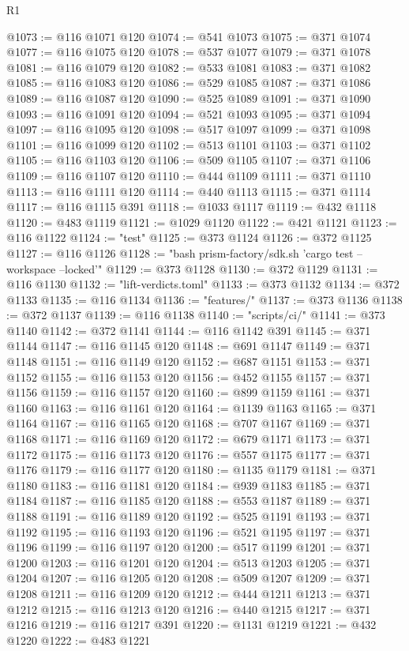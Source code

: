 \begin{lexlean}{R1}
\begin{coremodule}
@1073 := @116 @1071 @120
@1074 := @541 @1073
@1075 := @371 @1074
@1077 := @116 @1075 @120
@1078 := @537 @1077
@1079 := @371 @1078
@1081 := @116 @1079 @120
@1082 := @533 @1081
@1083 := @371 @1082
@1085 := @116 @1083 @120
@1086 := @529 @1085
@1087 := @371 @1086
@1089 := @116 @1087 @120
@1090 := @525 @1089
@1091 := @371 @1090
@1093 := @116 @1091 @120
@1094 := @521 @1093
@1095 := @371 @1094
@1097 := @116 @1095 @120
@1098 := @517 @1097
@1099 := @371 @1098
@1101 := @116 @1099 @120
@1102 := @513 @1101
@1103 := @371 @1102
@1105 := @116 @1103 @120
@1106 := @509 @1105
@1107 := @371 @1106
@1109 := @116 @1107 @120
@1110 := @444 @1109
@1111 := @371 @1110
@1113 := @116 @1111 @120
@1114 := @440 @1113
@1115 := @371 @1114
@1117 := @116 @1115 @391
@1118 := @1033 @1117
@1119 := @432 @1118
@1120 := @483 @1119
@1121 := @1029 @1120
@1122 := @421 @1121
@1123 := @116 @1122
@1124 := "test"
@1125 := @373 @1124
@1126 := @372 @1125
@1127 := @116 @1126
@1128 := "bash prism-factory/sdk.sh 'cargo test --workspace --locked'"
@1129 := @373 @1128
@1130 := @372 @1129
@1131 := @116 @1130
@1132 := "lift-verdicts.toml"
@1133 := @373 @1132
@1134 := @372 @1133
@1135 := @116 @1134
@1136 := "features/"
@1137 := @373 @1136
@1138 := @372 @1137
@1139 := @116 @1138
@1140 := "scripts/ci/"
@1141 := @373 @1140
@1142 := @372 @1141
@1144 := @116 @1142 @391
@1145 := @371 @1144
@1147 := @116 @1145 @120
@1148 := @691 @1147
@1149 := @371 @1148
@1151 := @116 @1149 @120
@1152 := @687 @1151
@1153 := @371 @1152
@1155 := @116 @1153 @120
@1156 := @452 @1155
@1157 := @371 @1156
@1159 := @116 @1157 @120
@1160 := @899 @1159
@1161 := @371 @1160
@1163 := @116 @1161 @120
@1164 := @1139 @1163
@1165 := @371 @1164
@1167 := @116 @1165 @120
@1168 := @707 @1167
@1169 := @371 @1168
@1171 := @116 @1169 @120
@1172 := @679 @1171
@1173 := @371 @1172
@1175 := @116 @1173 @120
@1176 := @557 @1175
@1177 := @371 @1176
@1179 := @116 @1177 @120
@1180 := @1135 @1179
@1181 := @371 @1180
@1183 := @116 @1181 @120
@1184 := @939 @1183
@1185 := @371 @1184
@1187 := @116 @1185 @120
@1188 := @553 @1187
@1189 := @371 @1188
@1191 := @116 @1189 @120
@1192 := @525 @1191
@1193 := @371 @1192
@1195 := @116 @1193 @120
@1196 := @521 @1195
@1197 := @371 @1196
@1199 := @116 @1197 @120
@1200 := @517 @1199
@1201 := @371 @1200
@1203 := @116 @1201 @120
@1204 := @513 @1203
@1205 := @371 @1204
@1207 := @116 @1205 @120
@1208 := @509 @1207
@1209 := @371 @1208
@1211 := @116 @1209 @120
@1212 := @444 @1211
@1213 := @371 @1212
@1215 := @116 @1213 @120
@1216 := @440 @1215
@1217 := @371 @1216
@1219 := @116 @1217 @391
@1220 := @1131 @1219
@1221 := @432 @1220
@1222 := @483 @1221

\end{coremodule}
\end{lexlean}

